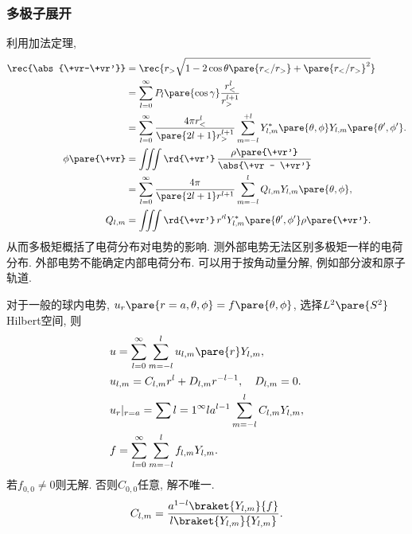 \documentclass[hidelinks]{ctexart}
\begin{document}

\subsubsection{多极子展开} %
\label{ssub:多极子展开}

利用加法定理,
\begin{align*}
    \rec{\abs{\+vr-\+vr'}} &= \rec{r_> \sqrt{1-2\cos\theta\pare{r_< / r_>} + \pare{r_</r_>}^2}} \\
    &= \sum_{l=0}^\infty P_l\pare{\cos\gamma} \frac{r_<^l}{r_>^{l+1}} \\
    &= \sum_{l=0}^\infty \frac{4\pi r^l_<}{\pare{2l+1}r_>^{l+1}} \sum_{m=-l}^{+l} Y^*_{l,m}\pare{\theta,\phi}Y_{l,m}\pare{\theta',\phi'}. \\
    \phi\pare{\+vr} &= \iiint \rd{\+vr'}\, \frac{\rho\pare{\+vr'}}{\abs{\+vr - \+vr'}} \\
    &= \sum_{l=0}^\infty \frac{4\pi}{\pare{2l+1}r^{l+1}}\sum_{m=-l}^l Q_{l,m} Y_{l,m}\pare{\theta,\phi}, \\
    Q_{l,m} &= \iiint \rd{\+vr'} \, r'^l Y^*_{l,m}\pare{\theta',\phi'}\rho\pare{\+vr'}.
\end{align*}
\newpoint{}从而多极矩概括了电荷分布对电势的影响.
\newpoint{}测外部电势无法区别多极矩一样的电荷分布.
\newpoint{}外部电势不能确定内部电荷分布.
\newpoint{}可以用于按角动量分解, 例如部分波和原子轨道.



\begin{sample}
    \begin{ex}
        对于一般的球内电势, $u_r\pare{r=a,\theta,\phi} = f\pare{\theta,\phi}$, 选择$L^2\pare{S^2}$Hilbert空间, 则
        \begin{align*}
            & u = \sum_{l=0}^\infty \sum_{m=-l}^l u_{l,m}\pare{r} Y_{l,m}, \\
            & u_{l,m} = C_{l,m}r^l + D_{l,m}r^{-l-1},\quad D_{l,m} = 0. \\
            & u_r\vert_{r=a} = \sum{l=1}^\infty la^{l-1}\sum_{m=-l}^l C_{l,m}Y_{l,m}, \\
            & f = \sum_{l=0}^\infty \sum_{m=-l}^l f_{l,m}Y_{l,m}.
        \end{align*}
        若$f_{0,0}\neq 0$则无解. 否则$C_{0,0}$任意, 解不唯一.
        \[ C_{l,m} = \frac{a^{1-l}\braket{Y_{l,m}}{f}}{l\braket{Y_{l,m}}{Y_{l,m}}}. \]
    \end{ex}
\end{sample}
\end{document}
